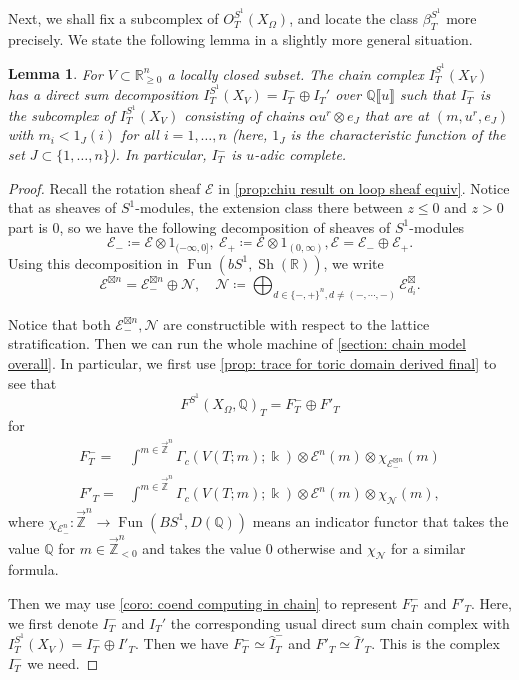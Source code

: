 \documentclass[11pt]{amsart}
\numberwithin{equation}{section}
\theoremstyle{plain}
\newtheorem{Lemma}[lemma]{Lemma}
\theoremstyle{definition}
\theoremstyle{remark}
\newcommand{\bQ} { {\mathbb{Q}}}
\newcommand{\bR} { {\mathbb{R}}}
\newcommand{\cE} { {\mathcal{E}}}
\newcommand{\fpw}[1]{{\llbracket #1\rrbracket}}
\newcommand{\Sh} { {\operatorname{Sh}}}
\newcommand\Fun{\operatorname{Fun}}
\newcommand{\rarbZ} { \overrightarrow{\mathbb{Z}}}
\begin{document}
Next, we shall fix a subcomplex of $O^{S^1}_{T}(X_\Omega)$, and locate the class $\beta_T^{S^1}$ more precisely. We state the following lemma in a slightly more general situation.
\begin{Lemma}\label{lemma: negative speed decomposition for chain model of toric}For $V\subset \bR^n_{\geq0}$ a locally closed subset. The chain complex $I^{S^1}_{T}(X_V)$ has a direct sum decomposition  $I^{S^1}_{T}(X_V)=I_T^-\oplus I_T'$ over $\bQ\fpw{u}$ such that $I_T^-$ is the subcomplex of $I^{S^1}_{T}(X_V)$ consisting of chains $\alpha u^r\otimes e_J$ that are at $(m,u^r,e_J)$ with $m_i<1_{J}(i)$ for all $i=1,\dots, n$ (here, $1_J$ is the characteristic function of the set $J\subset \{1,\dots,n\}$). In particular, $I_T^-$ is $u$-adic complete. 
\end{Lemma}
\begin{proof}Recall the rotation sheaf $\cE$ in \autoref{prop:chiu result on loop sheaf equiv}. Notice that as sheaves of $S^1$-modules, the extension class there between $z\leq 0$ and $z> 0$ part is $0$, so we have the following decomposition of sheaves of $S^1$-modules
\[\cE_-\coloneqq \cE\otimes 1_{(-\infty,0]},~\cE_+\coloneqq \cE\otimes 1_{(0,\infty)}, \cE=\cE_-\oplus \cE_+.\]
Using this decomposition in $\Fun(bS^1,\Sh(\bR))$, we write
\[\cE^{\boxtimes n}=\cE_-^{\boxtimes n}\oplus \mathcal{N},\quad \mathcal{N}\coloneqq \bigoplus_{d\in \{-,+\}^n, d\neq (-,\cdots,-)} \cE^\boxtimes_{d_i}. \] 

Notice that both $\cE_-^{\boxtimes n}, \mathcal{N}$ are constructible with respect to the lattice stratification. Then we can run the whole machine of \autoref{section: chain model overall}. In particular, we first use \autoref{prop: trace for toric domain derived final} to see that 
\[F^{S^1}(X_\Omega,\bQ)_T= F^-_T\oplus F'_T\]
for
\begin{align*}
    F^-_T=&\int^{m\in\rarbZ^n} \Gamma_c({ V(T;m)} ;\Bbbk  )\otimes \cE^n(m) \otimes \chi_{\cE_-^{\boxtimes n}}(m)  \\
    F'_T=&\int^{m\in\rarbZ^n} \Gamma_c({ V(T;m)} ;\Bbbk  )\otimes\cE^n(m)\otimes \chi_{\mathcal{N}}(m),
\end{align*}
where $\chi_{\cE^n_-}:\rarbZ^n\to \Fun(BS^1,D(\bQ))$ means an indicator functor that takes the value $\bQ$ for $m \in \rarbZ^n_{<0}$ and takes the value $0$ otherwise and $\chi_{\mathcal{N}}$ for a similar formula.

Then we may use \autoref{coro: coend computing in chain} to represent $F^-_T$ and $F'_T$. Here, we first denote $I_T^-$ and $I_T'$ the corresponding usual direct sum chain complex with $I^{S^1}_{T}(X_V)=I^-_T\oplus I'_T$. Then we have $F^-_T\simeq \widehat I^-_T$ and $F'_T\simeq \widehat I'_T$. This is the complex $I^-_T$ we need.


\end{proof}
\end{document}
